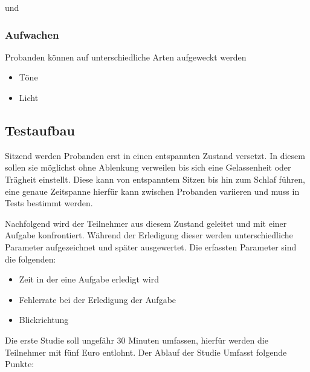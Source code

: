 
und


\subsubsection{Aufwachen}
Probanden können auf unterschiedliche Arten aufgeweckt werden~\cite{jewett1999time, ferrara2000sleep}
\begin{itemize}
    \item Töne
    \item Licht
\end{itemize}

\subsection{Testaufbau}
Sitzend werden Probanden erst in einen entspannten Zustand versetzt. In diesem sollen sie möglichst ohne Ablenkung verweilen bis sich eine Gelassenheit oder Trägheit einstellt. Diese kann von entspanntem Sitzen bis hin zum Schlaf führen, eine genaue Zeitspanne hierfür kann zwischen Probanden variieren und muss in Tests bestimmt werden.

Nachfolgend wird der Teilnehmer aus diesem Zustand geleitet und mit einer Aufgabe konfrontiert. Während der Erledigung dieser werden unterschiedliche Parameter aufgezeichnet und später ausgewertet. Die erfassten Parameter sind die folgenden:

\begin{itemize}
    \item Zeit in der eine Aufgabe erledigt wird
    \item Fehlerrate bei der Erledigung der Aufgabe
    \item Blickrichtung
\end{itemize}

Die erste Studie soll ungefähr 30 Minuten umfassen, hierfür werden die Teilnehmer mit fünf Euro entlohnt. Der Ablauf der Studie Umfasst folgende Punkte:

